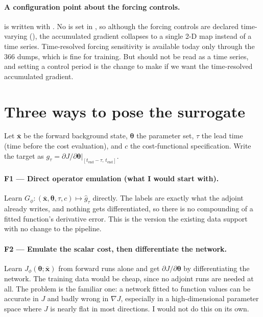 \paragraph{A configuration point about the forcing controls.}
 is written with . No
 is set in , so although
the forcing controls are declared time-varying (), the
accumulated gradient collapses to a single 2-D map instead of a time series.
Time-resolved forcing sensitivity is available today only through the $366$
 dumps, which is fine for training. But  should
not be read as a time series, and setting a control period is the change to
make if we want the time-resolved accumulated gradient.

\section{Three ways to pose the surrogate}

Let $\bar{\mathbf{x}}$ be the forward background state, $\boldsymbol{\theta}$
the parameter set, $\tau$ the lead time (time before the cost evaluation), and
$c$ the cost-functional specification. Write the target as
$g_\tau = \partial J/\partial\boldsymbol{\theta}\big|_{[t_{\text{end}}-\tau,\,t_{\text{end}}]}$.

\paragraph{F1 --- Direct operator emulation (what I would start with).}
Learn $G_\phi:(\bar{\mathbf{x}},\boldsymbol{\theta},\tau,c)\mapsto\hat{g}_\tau$
directly. The labels are exactly what the adjoint already writes, and nothing
gets differentiated, so there is no compounding of a fitted function's
derivative error. This is the version the existing data support with no change
to the pipeline.

\paragraph{F2 --- Emulate the scalar cost, then differentiate the network.}
Learn $J_\phi(\boldsymbol{\theta};\bar{\mathbf{x}})$ from forward runs alone and
get $\partial J/\partial\boldsymbol{\theta}$ by differentiating the network.
The training data would be cheap, since no adjoint runs are needed at all. The
problem is the familiar one: a network fitted to function values can be
accurate in $J$ and badly wrong in $\nabla J$, especially in a
high-dimensional parameter space where $J$ is nearly flat in most directions.
I would not do this on its own.

